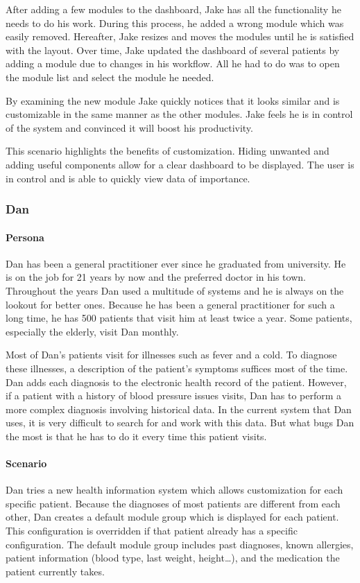         After adding a few modules to the dashboard, Jake has all the functionality he needs to do his work. During this process, he added a wrong module which was easily removed. Hereafter, Jake resizes and moves the modules until he is satisfied with the layout. Over time, Jake updated the dashboard of several patients by adding a module due to changes in his workflow. All he had to do was to open the module list and select the module he needed.

        By examining the new module Jake quickly notices that it looks similar and is customizable in the same manner as the other modules. Jake feels he is in control of the system and convinced it will boost his productivity.\bigskip
        
        \noindent This scenario highlights the benefits of customization. Hiding unwanted and adding useful components allow for a clear dashboard to be displayed. The user is in control and is able to quickly view data of importance.
        
        \subsubsection{Dan}

        \paragraph{Persona} Dan has been a general practitioner ever since he graduated from university. He is on the job for 21 years by now and the preferred doctor in his town. Throughout the years Dan used a multitude of systems and he is always on the lookout for better ones. Because he has been a general practitioner for such a long time, he has 500 patients that visit him at least twice a year. Some patients, especially the elderly, visit Dan monthly.

        Most of Dan's patients visit for illnesses such as fever and a cold. To diagnose these illnesses, a description of the patient's symptoms suffices most of the time. Dan adds each diagnosis to the electronic health record of the patient. However, if a patient with a history of blood pressure issues visits, Dan has to perform a more complex diagnosis involving historical data. In the current system that Dan uses, it is very difficult to search for and work with this data. But what bugs Dan the most is that he has to do it every time this patient visits.

        \paragraph{Scenario} Dan tries a new health information system which allows customization for each specific patient. Because the diagnoses of most patients are different from each other, Dan creates a default module group which is displayed for each patient. This configuration is overridden if that patient already has a specific configuration. The default module group includes past diagnoses, known allergies, patient information (blood type, last weight, height\ldots), and the medication the patient currently takes.

